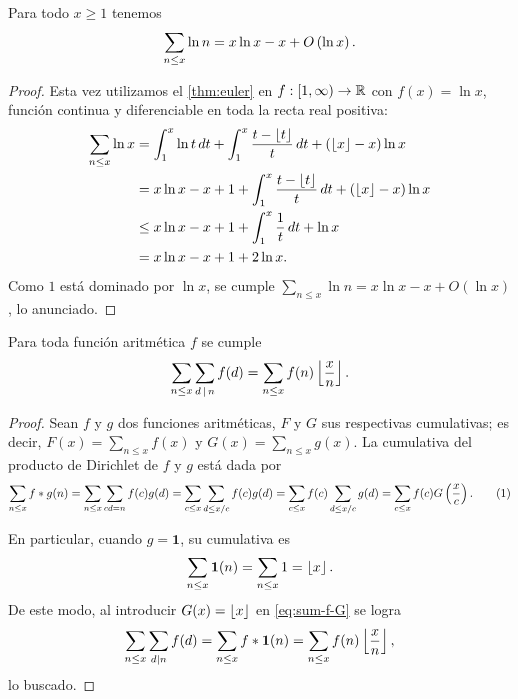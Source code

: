 \begin{lemma}
  \label{lem:sum-ln}
  Para todo \(x \geq 1\) tenemos
  \[
    \sum_{n \leq x} \ln n = x\ln x - x + O\left( \ln x \right).
  \]
\end{lemma}

\begin{proof}
  Esta vez utilizamos el \cref{thm:euler} en
  \(f : [1, \infty) \to \mathbb{R}\) con \(f(x) = \ln x\),
  funci\'on continua y diferenciable en toda la recta real positiva:  
  \begin{align*}
    \sum_{n \leq x} \ln x &= \int_1^x \ln t \, dt +
    \int_1^x  \frac{t - \left\lfloor t \right\rfloor}{t} \, dt + \left( \left\lfloor x \right\rfloor - x \right) \ln x  \\
    &= x \ln x - x + 1 + \int_1^x \frac{t - \left\lfloor t \right\rfloor}{t} \, dt
    + \left( \left\lfloor x \right\rfloor - x \right) \ln x \\
    &\leq x \ln x - x + 1 + \int_1^x \frac{1}{t} \,dt + \ln x \\
    &= x \ln x - x + 1 + 2 \ln x.
  \end{align*}
  Como \(1\) est\'a dominado por \(\ln x\),
  se cumple \(\sum_{n \leq x} \ln n = x\ln x - x + O(\ln x)\), 
  lo anunciado.
\end{proof}

\begin{lemma}
  \label{lem:sum-sum-f}
  Para toda funci\'on aritm\'etica \(f\) se cumple
  \[
    \sum_{n \leq x} \sum_{d \, \mid \, n} f(d) =
    \sum_{n \leq x} f(n) \left\lfloor \frac{x}{n} \right\rfloor.
  \]
\end{lemma}

\begin{proof}
  Sean \(f\) y \(g\) dos funciones aritm\'eticas,
  \(F\) y \(G\) sus respectivas cumulativas;
  es decir, \(F(x) = \sum_{n \leq x} f(x)\) y
  \(G(x) = \sum_{n \leq x} g(x)\).
  La cumulativa del producto de Dirichlet de \(f\) y \(g\) est\'a dada por 
  \[
    \sum_{n \leq x} f * g (n) = \sum_{n \leq x} \sum_{cd = n} f(c)g(d)
    = \sum_{c \leq x} \sum_{d \leq x/c} f(c) g(d)
    = \sum_{c \leq x} f(c) \sum_{d \leq x/c} g(d)
    = \sum_{c \leq x} f(c) G\parentheses{\frac{x}{c}}.
    \eqlabel{eq:sum-f-G}
  \]

  En particular, cuando \(g = \mathbf{1}\), su cumulativa es
  \[
    \sum_{n \leq x} \mathbf{1}(n) = \sum_{n \leq x} 1 = \left\lfloor x \right\rfloor.
  \]
  De este modo, al introducir \(G(x) = \left\lfloor x \right\rfloor\) en \eqref{eq:sum-f-G} se logra
  \[
    \sum_{n \leq x} \sum_{d \mid n} f(d)
    = \sum_{n \leq x} f * \mathbf{1} (n)
    = \sum_{n \leq x} f(n) \left\lfloor \frac{x}{n} \right\rfloor,
  \]
  lo buscado.
\end{proof}

